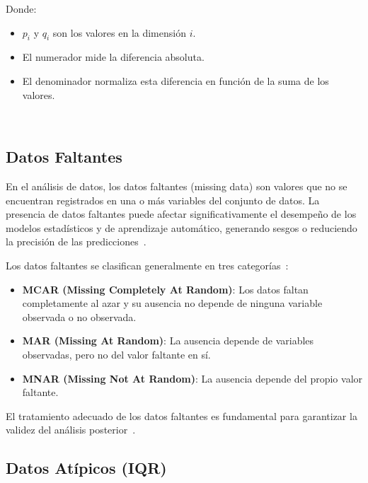 \documentclass[12pt]{article}
\begin{document}
Donde:
\begin{itemize}
    \item $p_i$ y $q_i$ son los valores en la dimensión $i$.
    \item El numerador mide la diferencia absoluta.
    \item El denominador normaliza esta diferencia en función de la suma de los valores.
\end{itemize}

~\cite{De0a100enIA}

\subsection{Datos Faltantes}

En el análisis de datos, los datos faltantes (missing data) son valores que no se encuentran registrados en una o más variables del conjunto de datos. La presencia de datos faltantes puede afectar significativamente el desempeño de los modelos estadísticos y de aprendizaje automático, generando sesgos o reduciendo la precisión de las predicciones~\cite{little2019missing}.

Los datos faltantes se clasifican generalmente en tres categorías~\cite{little2019missing}:

\begin{itemize}
    \item \textbf{MCAR (Missing Completely At Random)}: Los datos faltan completamente al azar y su ausencia no depende de ninguna variable observada o no observada.
    \item \textbf{MAR (Missing At Random)}: La ausencia depende de variables observadas, pero no del valor faltante en sí.
    \item \textbf{MNAR (Missing Not At Random)}: La ausencia depende del propio valor faltante.
\end{itemize}

El tratamiento adecuado de los datos faltantes es fundamental para garantizar la validez del análisis posterior~\cite{hastie2009elements}.
\subsection{Datos Atípicos (IQR)}
\end{document}
